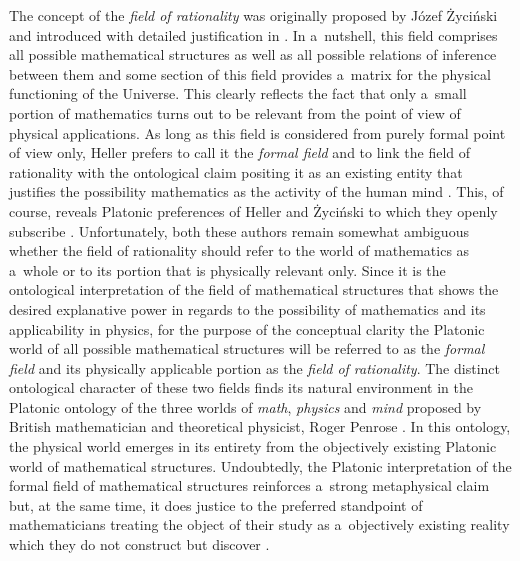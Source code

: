 The concept of the \textit{field of rationality} was originally proposed by Józef Życiński and introduced with detailed justification in 
\parencite[][]{zycinski_filozoficzne_1987}. %
 In a~nutshell, this field comprises all possible mathematical structures as well as all possible relations of inference between them and some section of this field provides a~matrix for the physical functioning of the Universe. This clearly reflects the fact that only a~small portion of mathematics turns out to be relevant from the point of view of physical applications. As long as this field is considered from purely formal point of view only, Heller prefers to call it the \textit{formal field} and to link the field of rationality with the ontological claim positing it as an existing entity that justifies the possibility mathematics as the activity of the human mind 
\parencite[][p.238]{heller_uchwycic_1997}. %
 This, of course, reveals Platonic preferences of Heller and Życiński to which they openly subscribe 
\parencite[e.g][]{zycinski_swiat_2013}. %
 Unfortunately, both these authors remain somewhat ambiguous whether the field of rationality should refer to the world of mathematics as a~whole or to its portion that is physically relevant only. Since it is the ontological interpretation of the field of mathematical structures that shows the desired explanative power in regards to the possibility of mathematics and its applicability in physics, for the purpose of the conceptual clarity the Platonic world of all possible mathematical structures will be referred to as the \textit{formal field} and its physically applicable portion as the \textit{field of rationality}. The distinct ontological character of these two fields finds its natural environment in the Platonic ontology of the three worlds of \textit{math}, \textit{physics} and \textit{mind} proposed by British mathematician and theoretical physicist, Roger Penrose 
\parencite[e.g][pp.17–21]{}. %
 In this ontology, the physical world emerges in its entirety from the objectively existing Platonic world of mathematical structures. Undoubtedly, the Platonic interpretation of the formal field of mathematical structures reinforces a~strong metaphysical claim but, at the same time, it does justice to the preferred standpoint of mathematicians treating the object of their study as a~objectively existing reality which they do not construct but discover 
\parencite[e.g][p.13]{penrose_road_2004}.%





